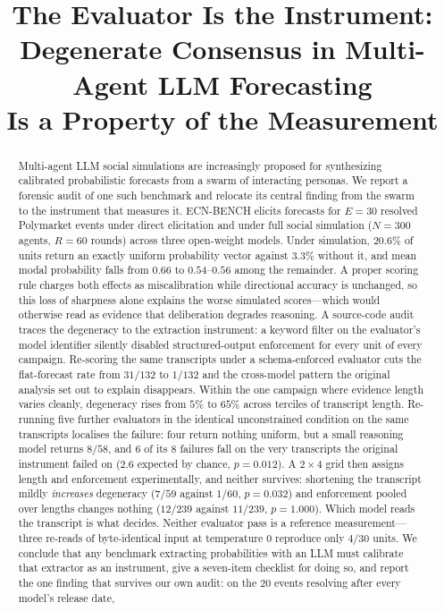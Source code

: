 \documentclass[10pt,conference]{IEEEtran}
\begin{document}
\title{\bfseries The Evaluator Is the Instrument:\\
Degenerate Consensus in Multi-Agent LLM Forecasting\\
Is a Property of the Measurement}

\author{
}

\maketitle

\begin{abstract}
Multi-agent LLM social simulations are increasingly proposed for synthesizing calibrated probabilistic forecasts from a swarm of interacting personas. We report a forensic audit of one such benchmark and relocate its central finding from the swarm to the instrument that measures it. ECN-BENCH elicits forecasts for $E=30$ resolved Polymarket events under direct elicitation and under full social simulation ($N=300$ agents, $R=60$ rounds) across three open-weight models. Under simulation, $20.6\%$ of units return an exactly uniform probability vector against $3.3\%$ without it, and mean modal probability falls from $0.66$ to $0.54$--$0.56$ among the remainder. A proper scoring rule charges both effects as miscalibration while directional accuracy is unchanged, so this loss of sharpness alone explains the worse simulated scores---which would otherwise read as evidence that deliberation degrades reasoning. A source-code audit traces the degeneracy to the extraction instrument: a keyword filter on the evaluator's model identifier silently disabled structured-output enforcement for every unit of every campaign. Re-scoring the same transcripts under a schema-enforced evaluator cuts the flat-forecast rate from $31/132$ to $1/132$ and the cross-model pattern the original analysis set out to explain disappears. Within the one campaign where evidence length varies cleanly, degeneracy rises from $5\%$ to $65\%$ across terciles of transcript length. Re-running five further evaluators in the identical unconstrained condition on the same transcripts localises the failure: four return nothing uniform, but a small reasoning model returns $8/58$, and $6$ of its $8$ failures fall on the very transcripts the original instrument failed on ($2.6$ expected by chance, $p = 0.012$). A $2\times4$ grid then assigns length and enforcement experimentally, and neither survives: shortening the transcript mildly \emph{increases} degeneracy ($7/59$ against $1/60$, $p = 0.032$) and enforcement pooled over lengths changes nothing ($12/239$ against $11/239$, $p = 1.000$). Which model reads the transcript is what decides. Neither evaluator pass is a reference measurement---three re-reads of byte-identical input at temperature $0$ reproduce only $4/30$ units. We conclude that any benchmark extracting probabilities with an LLM must calibrate that extractor as an instrument, give a seven-item checklist for doing so, and report the one finding that survives our own audit: on the $20$ events resolving after every model's release date, 
\end{abstract}
\end{document}
